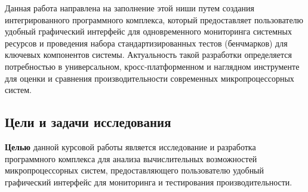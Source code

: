 Данная работа направлена на заполнение этой ниши путем создания интегрированного программного комплекса, который предоставляет пользователю удобный графический интерфейс для одновременного мониторинга системных ресурсов и проведения набора стандартизированных тестов (бенчмарков) для ключевых компонентов системы. Актуальность такой разработки определяется потребностью в универсальном, кросс-платформенном и наглядном инструменте для оценки и сравнения производительности современных микропроцессорных систем.

\subsection*{Цели и задачи исследования}

\textbf{Целью} данной курсовой работы является исследование и разработка программного комплекса для анализа вычислительных возможностей микропроцессорных систем, предоставляющего пользователю удобный графический интерфейс для мониторинга и тестирования производительности.

